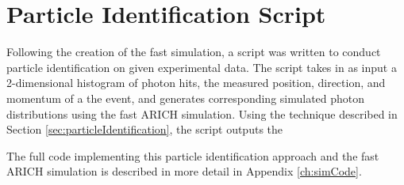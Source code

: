 
\section{Particle Identification Script}
Following the creation of the fast simulation, a script was written to conduct particle identification on given experimental data.
The script takes in as input a 2-dimensional histogram of photon hits, the measured position, direction, and momentum of a the event, and generates corresponding simulated photon distributions using the fast ARICH simulation.
Using the technique described in Section \ref{sec:particleIdentification}, the script outputs the 

The full code implementing this particle identification approach and the fast ARICH simulation is described in more detail in Appendix \ref{ch:simCode}.

\endinput



\section{Comparison with Geant4} 
In this section, I will compare the simulated photon distribution between my simulation and the full Geant4 simulation.
They will be compared on a number of metrics, including the number of photons detected in the photon ring, and the level of background photons (determined by taking the ratio of histograms simulated by my simulation and by Geant4). This work is in progress: comparisons have been done, but it is still necessary to more accurately quantify the differences between the two simulations and display these results. I will describe the differences between my simulation and the full Geant4 simulation, and make the claim that my simulation contains enough of the necessary physics to simulate Cherenkov photons with sufficient accuracy for our purposes.

\section{Mirror}
In order to 


Any text after an \endinput is ignored.
You could put scraps here or things in progress.

